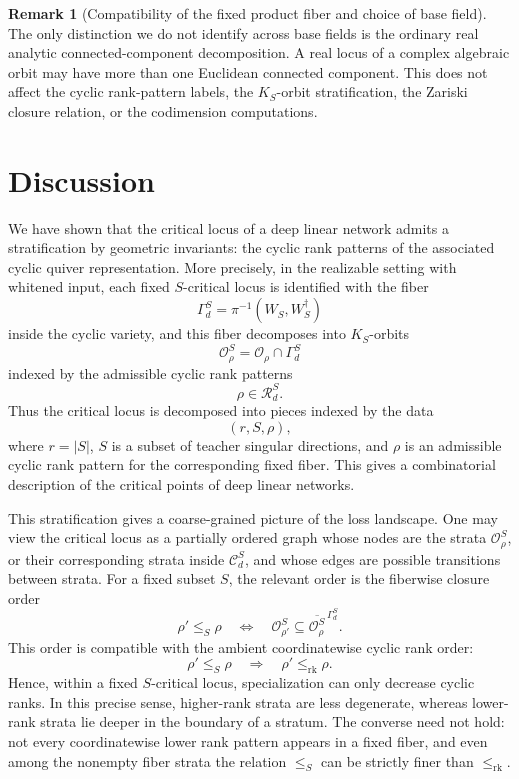 \documentclass[11pt]{article}
\theoremstyle{definition}
\newtheorem{remark}[theorem]{Remark}
\begin{document}
\begin{remark}[Compatibility of the fixed product fiber and choice of base field]
The only distinction we do not identify across base fields is the ordinary
real analytic connected-component decomposition. A real locus of a complex
algebraic orbit may have more than one Euclidean connected component. This
does not affect the cyclic rank-pattern labels, the \(K_S\)-orbit
stratification, the Zariski closure relation, or the codimension computations.
\end{remark}
\section{Discussion}
\label{sec:discussion}

We have shown that the critical locus of a deep linear network admits a
stratification by geometric invariants: the cyclic rank patterns of the
associated cyclic quiver representation. More precisely, in the realizable setting with whitened input, each fixed \(S\)-critical locus is identified with the fiber
\[
\Gamma_d^S
=
\pi^{-1}(W_S,W_S^{\dagger})
\]
inside the cyclic variety, and this fiber decomposes into \(K_S\)-orbits
\[
\mathcal O_\rho^S
=
\mathcal O_\rho\cap \Gamma_d^S
\]
indexed by the admissible cyclic rank patterns
\[
\rho\in \mathcal R_d^S.
\]
Thus the critical locus is decomposed into pieces indexed by the data
\[
(r,S,\rho),
\]
where \(r=|S|\), \(S\) is a subset of teacher singular directions, and
\(\rho\) is an admissible cyclic rank pattern for the corresponding fixed
fiber. This gives a combinatorial description of
the critical points of deep linear networks.

This stratification gives a coarse-grained picture of the loss landscape. One
may view the critical locus as a partially ordered graph whose nodes are the
strata \(\mathcal O_\rho^S\), or their corresponding strata inside
\(\mathcal C_d^S\), and whose edges are possible transitions between strata. For a fixed
subset \(S\), the relevant order is the fiberwise closure order
\[
\rho'\leq_S\rho
\quad\Longleftrightarrow\quad
\mathcal O_{\rho'}^S
\subseteq
\overline{\mathcal O_\rho^S}^{\,\Gamma_d^S}.
\]
This order is compatible with the ambient coordinatewise cyclic rank order:
\[
\rho'\leq_S\rho
\quad\Longrightarrow\quad
\rho'\leq_{\mathrm{rk}}\rho.
\]
Hence, within a fixed \(S\)-critical locus, specialization can only decrease
cyclic ranks. In this precise sense, higher-rank strata are less degenerate,
whereas lower-rank strata lie deeper in the boundary of a stratum. The converse
need not hold: not every coordinatewise lower rank pattern appears in a fixed
fiber, and even among the nonempty fiber strata the relation \(\leq_S\) can be
strictly finer than \(\leq_{\mathrm{rk}}\).
\end{document}
